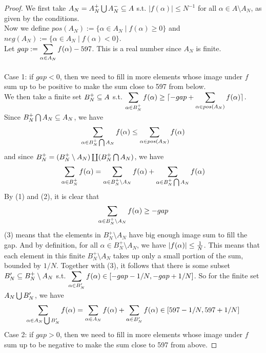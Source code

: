\documentclass[lang=cn,11pt]{elegantbook}
\begin{document}
\begin{proof}
We first take $A_N = A_N^+ \bigcup A_N^- \subseteq A$  s.t.   $\lvert f(\alpha) \rvert \leq N^{-1}$ for all $\alpha \in A \setminus A_N$, as given by the conditions.\\
Now we define $pos(A_N) := \{ \alpha \in A_N \mid f(\alpha) \geq 0 \}$ and $neg(A_N) := \{ \alpha \in A_N \mid f(\alpha) < 0 \}$.\\
Let $gap := \displaystyle \sum_{\alpha \in A_N} f(\alpha) - 597$. This is a real number since $A_N$ is finite.\\\\
Case 1: if $gap<0$, then we need to fill in more elements whose image under $f$ sum up to be positive to make the sum close to 597 from below. \\ 
We then take a finite set $B_N^+ \subseteq A$ s.t. $\displaystyle \sum_{\alpha \in B_N^+} f(\alpha) \geq \lceil -gap + \sum_{\alpha \in pos(A_N)} f(\alpha) \rceil$.\\
Since $B_N^+ \bigcap A_N \subseteq A_N$, we have 
\begin{equation}
  \sum_{\alpha \in B_N^+ \bigcap A_N} f(\alpha) \leq \sum_{\alpha \in pos(A_N)} f(\alpha)  
\end{equation}
and since $B_N^+ = (B_N^+ \setminus A_N) \coprod (B_N^+ \bigcap A_N)$, we have
\begin{equation}
    \sum_{\alpha \in B_N^+} f(\alpha)= \sum_{\alpha \in B_N^+ \setminus A_N} f(\alpha) + \sum_{\alpha \in B_N^+ \bigcap A_N} f(\alpha)
\end{equation}
By (1) and (2), it is clear that 
\begin{equation}
   \displaystyle \sum_{\alpha \in B_N^+ \setminus A_N} f(\alpha) \geq -gap 
\end{equation}
(3) means that the elements in $B_N^+ \setminus A_N$ have big enough image sum to fill the gap.
And by definition, for all $\alpha \in B_N^+ \setminus A_N$, we have $|f(\alpha)|\leq {1\over N}$. This means that each element in this finite $B_N^+ \setminus A_N$ takes up only a small portion of the sum, bounded by $1/N$.
Together with (3), it follows that there is some subset $B_N' \subseteq B_N^+ \setminus A_N$ s.t. $\displaystyle \sum_{\alpha \in B_N'} f(\alpha) \in [-gap-1/N, -gap+1/N]$. So for the finite set $A_N \bigcup B_N'$, we have 
\begin{equation}
    \sum_{\alpha \in A_N \bigcup B_N'}f(\alpha) = \sum_{\alpha \in A_N}f(\alpha) + \sum_{\alpha \in  B_N'}f(\alpha) \in [597-1/N, 597+1/N]
\end{equation}
Case 2: if $gap>0$, then we need to fill in more elements whose image under $f$ sum up to be negative to make the sum close to 597 from above.

\end{proof}
\end{document}
